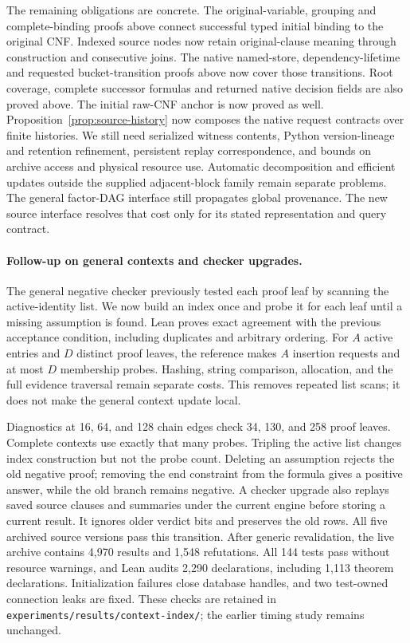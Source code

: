 \documentclass[11pt,a4paper]{article}
\numberwithin{equation}{section}
\theoremstyle{plain}
\theoremstyle{definition}
\theoremstyle{remark}
\begin{document}
The remaining obligations are concrete. The original-variable, grouping and complete-binding proofs above connect successful typed initial binding to the original CNF. Indexed source nodes now retain original-clause meaning through construction and consecutive joins. The native named-store, dependency-lifetime and requested bucket-transition proofs above now cover those transitions. Root coverage, complete successor formulas and returned native decision fields are also proved above. The initial raw-CNF anchor is now proved as well. Proposition~\ref{prop:source-history} now composes the native request contracts over finite histories. We still need serialized witness contents, Python version-lineage and retention refinement, persistent replay correspondence, and bounds on archive access and physical resource use. Automatic decomposition and efficient updates outside the supplied adjacent-block family remain separate problems. The general factor-DAG interface still propagates global provenance. The new source interface resolves that cost only for its stated representation and query contract.

\paragraph{Follow-up on general contexts and checker upgrades.}
The general negative checker previously tested each proof leaf by scanning the active-identity list. We now build an index once and probe it for each leaf until a missing assumption is found. Lean proves exact agreement with the previous acceptance condition, including duplicates and arbitrary ordering. For $A$ active entries and $D$ distinct proof leaves, the reference makes $A$ insertion requests and at most $D$ membership probes. Hashing, string comparison, allocation, and the full evidence traversal remain separate costs. This removes repeated list scans; it does not make the general context update local.

Diagnostics at 16, 64, and 128 chain edges check 34, 130, and 258 proof leaves. Complete contexts use exactly that many probes. Tripling the active list changes index construction but not the probe count. Deleting an assumption rejects the old negative proof; removing the end constraint from the formula gives a positive answer, while the old branch remains negative. A checker upgrade also replays saved source clauses and summaries under the current engine before storing a current result. It ignores older verdict bits and preserves the old rows. All five archived source versions pass this transition. After generic revalidation, the live archive contains 4,970 results and 1,548 refutations. All 144 tests pass without resource warnings, and Lean audits 2,290 declarations, including 1,113 theorem declarations. Initialization failures close database handles, and two test-owned connection leaks are fixed. These checks are retained in \texttt{experiments/results/context-index/}; the earlier timing study remains unchanged.
\end{document}
